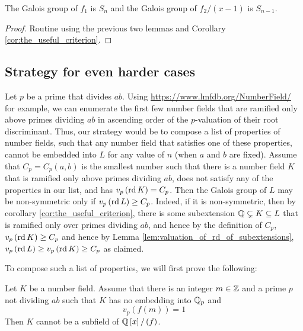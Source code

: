 \documentclass[../main.tex]{subfiles}
\begin{document}
\begin{corollary}
  The Galois group of $f_1$ is $S_n$ and the Galois group of $f_2 / \left( x - 1 \right)$ is $S_{n-1}$.
\end{corollary}
\begin{proof}
  Routine using the previous two lemmas and Corollary \ref{cor:the_useful_criterion}.
\end{proof}



\subsection{Strategy for even harder cases}


\begin{strategy}
  \label{strategy:harder_cases}
  Let $p$ be a prime that divides $a b$.
  Using \url{https://www.lmfdb.org/NumberField/} for example, we can enumerate the first few number fields that are ramified only above primes dividing $a b$ in ascending order of the $p$-valuation of their root discriminant.
  Thus, our strategy would be to compose a list of properties of number fields, such that any number field that satisfies one of these properties, cannot be embedded into $L$ for any value of $n$ (when $a$ and $b$ are fixed).
  Assume that $C_p = C_p\left( a,b \right)$ is the smallest number such that there is a number field $K$ that is ramified only above primes dividing $a b$, does not satisfy any of the properties in our list, and has $v_p\left( \operatorname{\rm rd} K \right) = C_p$.
  Then the Galois group of $L$ may be non-symmetric only if $v_p\left( \operatorname{\rm rd} L \right) \geq C_p$.
  Indeed, if it is non-symmetric, then by corollary \ref{cor:the_useful_criterion}, there is some subextension $\mathbb{Q} \subsetneq K \subseteq L$ that is ramified only over primes dividing $a b$, and hence by the definition of $C_p$, $v_p\left( \operatorname{\rm rd} K \right) \geq C_p$ and hence by Lemma \ref{lem:valuation_of_rd_of_subextensions}, $v_p\left( \operatorname{\rm rd} L \right) \geq v_p\left( \operatorname{\rm rd} K \right) \geq C_p$ as claimed.
\end{strategy} 
To compose such a list of properties, we will first prove the following:
\begin{lemma}
  \label{lem:imprimitivity_finite_obstruction}
  Let $K$ be a number field.
  Assume that there is an integer $m \in \mathbb{Z}$ and a prime $p$ not dividing $a b$ such that $K$ has no embedding into $\mathbb{Q}_p$ and 
  \[
    v_p\left( f\left( m \right) \right) = 1
  \]
  Then $K$ cannot be a subfield of $\mathbb{Q}\left[ x \right] / \left( f \right)$.
\end{lemma}
\end{document}
